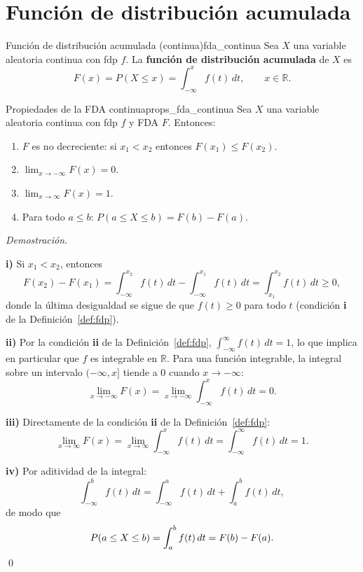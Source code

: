 \documentclass[12pt, a4paper]{book}
\renewenvironment{proof}{%
    \par\medskip\noindent\textit{Demostraci\'{o}n.}\enspace
}{\qed\par\medskip}
\numberwithin{equation}{chapter}
\begin{document}
\section{Funci\'{o}n de distribuci\'{o}n acumulada}

\begin{definicion}{Funci\'{o}n de distribuci\'{o}n acumulada
		(continua)}{fda_continua}
	Sea $X$ una variable aleatoria continua con fdp $f$. La
	\textbf{función de distribución acumulada} de $X$ es
	\[
	F(x) = P(X \leq x) = \int_{-\infty}^{x} f(t)\,dt,
	\qquad x \in \mathbb{R}.
	\]
\end{definicion}

\begin{proposicion}{Propiedades de la FDA continua}{props_fda_continua}
	Sea $X$ una variable aleatoria continua con fdp $f$ y FDA $F$.
	Entonces:
	\begin{enumerate}[label=\textbf{\roman*)}]
		\item $F$ es no decreciente: si $x_1 < x_2$ entonces
		$F(x_1) \leq F(x_2)$.
		\item $\lim_{x \to -\infty} F(x) = 0$.
		\item $\lim_{x \to \infty} F(x) = 1$.
		\item Para todo $a \leq b$:
		$P(a \leq X \leq b) = F(b) - F(a)$.
	\end{enumerate}
\end{proposicion}

\begin{proof}
	\textbf{i)} Si $x_1 < x_2$, entonces
	\[
	F(x_2) - F(x_1)
	= \int_{-\infty}^{x_2} f(t)\,dt -
	\int_{-\infty}^{x_1} f(t)\,dt
	= \int_{x_1}^{x_2} f(t)\,dt \geq 0,
	\]
	donde la última desigualdad se sigue de que $f(t) \geq 0$
	para todo $t$ (condición \textbf{i} de la
	Definición~\ref{def:fdp}).
	
	\medskip
	\textbf{ii)} Por la condición \textbf{ii} de la
	Definición~\ref{def:fdp}, $\int_{-\infty}^{\infty} f(t)\,dt = 1$,
	lo que implica en particular que $f$ es integrable en
	$\mathbb{R}$. Para una función integrable, la integral sobre
	un intervalo $(-\infty, x]$ tiende a $0$ cuando $x \to -\infty$:
	\[
	\lim_{x \to -\infty} F(x)
	= \lim_{x \to -\infty} \int_{-\infty}^{x} f(t)\,dt = 0.
	\]
	
	\medskip
	\textbf{iii)} Directamente de la condición \textbf{ii} de la
	Definición~\ref{def:fdp}:
	\[
	\lim_{x \to \infty} F(x)
	= \lim_{x \to \infty} \int_{-\infty}^{x} f(t)\,dt
	= \int_{-\infty}^{\infty} f(t)\,dt = 1.
	\]
	
	\medskip
	\textbf{iv)} Por aditividad de la integral:
	\[
	\int_{-\infty}^{b} f(t)\,dt
	= \int_{-\infty}^{a} f(t)\,dt + \int_{a}^{b} f(t)\,dt,
	\]
	de modo que
	\[
	P(a \leq X \leq b)
	= \int_a^b f(t)\,dt
	= F(b) - F(a). \qedhere
	\]
\end{proof}
\end{document}

